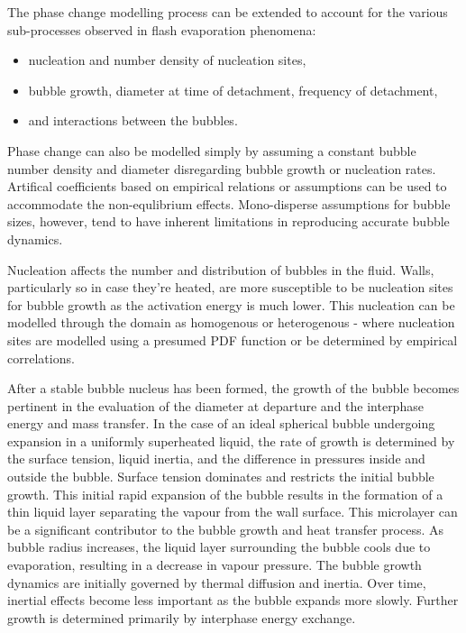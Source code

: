 The phase change modelling process can be extended to account for the various sub-processes observed in flash evaporation phenomena:
\begin{itemize}
    \item nucleation and number density of nucleation sites,
    \item bubble growth, diameter at time of detachment, frequency of detachment,
    \item and interactions between the bubbles.
\end{itemize}\cite{dangleComputationalFluidDynamics2018}
 Phase change can also be modelled simply by assuming a constant bubble number density and diameter disregarding bubble 
 growth or nucleation rates. Artifical coefficients based on empirical relations or assumptions can be used to accommodate the non-equlibrium effects.
 Mono-disperse assumptions for bubble sizes, however, tend to have inherent limitations in reproducing accurate bubble dynamics.~\cite{liaoNumericalAnalysisFlashing2019}


Nucleation affects the number and distribution of bubbles in the fluid. Walls, particularly so in case they're heated, are more susceptible 
 to be nucleation sites for bubble growth
 as the activation energy is much lower. This nucleation can be modelled through the domain as homogenous or heterogenous - where nucleation sites are modelled using a 
 presumed PDF function or be determined by empirical correlations.~\cite{liaoComputationalModellingFlash2017}

After a stable bubble nucleus has been formed, the growth of the bubble becomes pertinent in the evaluation
 of the diameter at departure and the interphase energy and mass transfer. In the case of an ideal
 spherical bubble undergoing expansion in a uniformly superheated liquid, the rate of growth
 is determined by the surface tension, liquid inertia, and the difference in pressures inside
 and outside the bubble. Surface tension dominates and restricts the initial bubble growth.
 This initial rapid expansion of the bubble results in the formation of a thin liquid layer separating
 the vapour from the wall surface. This microlayer can be a significant contributor to the 
 bubble growth and heat transfer process.
 As bubble radius increases, the liquid layer surrounding the bubble 
 cools due to evaporation, resulting in a decrease in vapour pressure. 
 The bubble growth dynamics are initially governed by thermal diffusion 
 and inertia. Over time, inertial effects become less important as 
 the bubble expands more slowly. Further growth is determined 
 primarily by interphase energy exchange.~\cite{sherFlashboilingAtomization2008} 

